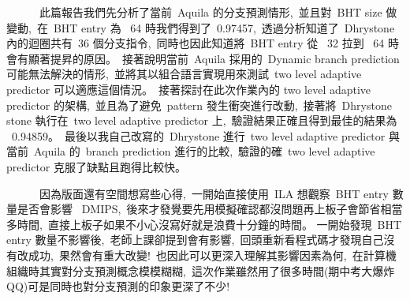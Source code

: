 \documentclass{article}
\begin{document}
\begin{CJK*}{UTF8}{bsmi}
\begin{multicols}{2}
\begin{flushleft}
    \ \ \ \ \ \ 此篇報告我們先分析了當前\ Aquila 的分支預測情形,\
    並且對\ BHT size 做變動,\
    在\ BHT entry 為 \ 64 時我們得到了\ 0.97457,\
    透過分析知道了\ Dhrystone 內的迴圈共有\ 36 個分支指令,\
    同時也因此知道將\ BHT entry 從 \ 32 拉到 \ 64 時會有顯著提昇的原因。\
    接著說明當前\ Aquila 採用的\ Dynamic branch prediction 可能無法解決的情形,\
    並將其以組合語言實現用來測試\ two level adaptive predictor 可以適應這個情況。\
    接著探討在此次作業內的 two level adaptive predictor 的架構,\
    並且為了避免\ pattern 發生衝突進行改動,\
    接著將\ Dhrystone stone 執行在\ two level adaptive predictor 上,\
    驗證結果正確且得到最佳的結果為 \ 0.94859。\
    最後以我自己改寫的\ Dhrystone 進行\ two level adaptive predictor 與當前\ Aquila 的\ branch prediction 進行的比較,\
    驗證的確\ two level adaptive predictor 克服了缺點且跑得比較快。\newline

    \ \ \ \ \ \ 因為版面還有空間想寫些心得,\
    一開始直接使用\ ILA 想觀察\ BHT entry 數量是否會影響 \ DMIPS,\
    後來才發覺要先用模擬確認都沒問題再上板子會節省相當多時間,\
    直接上板子如果不小心沒寫好就是浪費十分鐘的時間。
    一開始發現\ BHT entry 數量不影響後,\
    老師上課卻提到會有影響,\
    回頭重新看程式碼才發現自己沒有改成功,\
    果然會有重大改變!\
    也因此可以更深入理解其影響因素為何,\
    在計算機組織時其實對分支預測概念模模糊糊,\
    這次作業雖然用了很多時間(期中考大爆炸QQ)可是同時也對分支預測的印象更深了不少!\
\end{flushleft}

\columnbreak

\ 

\end{multicols}


\end{CJK*}
\end{document}
